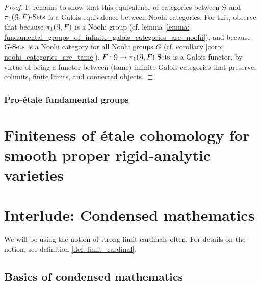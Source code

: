 \begin{proof}
                        It remains to show that this equivalence of categories between $\mathcal{G}$ and $\pi_1(\mathcal{G}, F)\text{-}\mathrm{Sets}$ is a Galois equivalence between Noohi categories. For this, observe that because $\pi_1(\mathcal{G}, F)$ is a Noohi group (cf. lemma \ref{lemma: fundamental_groups_of_infinite_galois_categories_are_noohi}), and because $G\text{-}\mathrm{Sets}$ is a Noohi category for all Noohi groups $G$ (cf. corollary \ref{coro: noohi_categories_are_tame}), $F: \mathcal{G} \to \pi_1(\mathcal{G}, F)\text{-}\mathrm{Sets}$ is a Galois functor, by virtue of being a functor between (tame) infinite Galois categories that preserves colimits, finite limits, and connected objects.
                    \end{proof}
                
            \subsubsection{Pro-\'etale fundamental groups}
        
    \section{Finiteness of \'etale cohomology for smooth proper rigid-analytic varieties}
    
    \section{Interlude: Condensed mathematics} \label{section: condensed_mathematics}
        \begin{remark}
            We will be using the notion of strong limit cardinals often. For details on the notion, see definition \ref{def: limit_cardinal}.
        \end{remark}
    
        \subsection{Basics of condensed mathematics}
